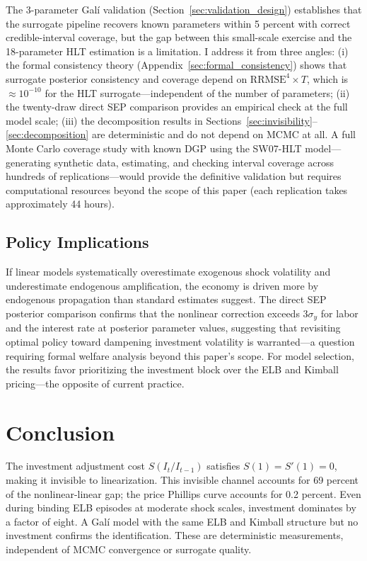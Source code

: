 \documentclass[12pt]{article}
\theoremstyle{plain}
\theoremstyle{definition}
\theoremstyle{remark}
\begin{document}
The 3-parameter Gal\'i validation (Section~\ref{sec:validation_design}) establishes that the surrogate pipeline recovers known parameters within 5 percent with correct credible-interval coverage, but the gap between this small-scale exercise and the 18-parameter HLT estimation is a limitation. I address it from three angles: (i) the formal consistency theory (Appendix~\ref{sec:formal_consistency}) shows that surrogate posterior consistency and coverage depend on $\text{RRMSE}^4 \times T$, which is $\approx 10^{-10}$ for the HLT surrogate---independent of the number of parameters; (ii) the twenty-draw direct SEP comparison provides an empirical check at the full model scale; (iii) the decomposition results in Sections~\ref{sec:invisibility}--\ref{sec:decomposition} are deterministic and do not depend on MCMC at all. A full Monte Carlo coverage study with known DGP using the SW07-HLT model---generating synthetic data, estimating, and checking interval coverage across hundreds of replications---would provide the definitive validation but requires computational resources beyond the scope of this paper (each replication takes approximately 44 hours).

\subsection{Policy Implications}

If linear models systematically overestimate exogenous shock volatility and underestimate endogenous amplification, the economy is driven more by endogenous propagation than standard estimates suggest. The direct SEP posterior comparison confirms that the nonlinear correction exceeds $3\sigma_y$ for labor and the interest rate at posterior parameter values, suggesting that revisiting optimal policy toward dampening investment volatility is warranted---a question requiring formal welfare analysis beyond this paper's scope. For model selection, the results favor prioritizing the investment block over the ELB and Kimball pricing---the opposite of current practice.


\section{Conclusion}
\label{sec:conclusion}

The investment adjustment cost $S(I_t/I_{t-1})$ satisfies $S(1) = S'(1) = 0$, making it invisible to linearization. This invisible channel accounts for 69 percent of the nonlinear-linear gap; the price Phillips curve accounts for 0.2 percent. Even during binding ELB episodes at moderate shock scales, investment dominates by a factor of eight. A Gal\'i model with the same ELB and Kimball structure but no investment confirms the identification. These are deterministic measurements, independent of MCMC convergence or surrogate quality.
\end{document}
